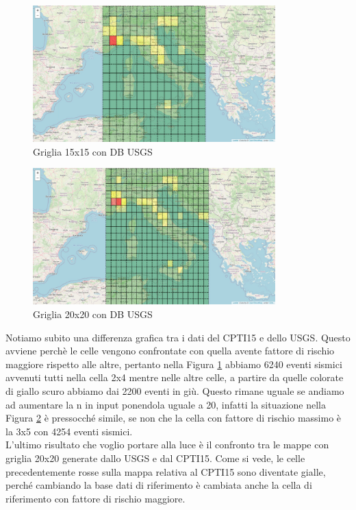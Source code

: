 \begin{figure}[H]
   \centering
   \includegraphics[width=0.835\textwidth]{images/15x15_USGS.jpg}
   \caption{Griglia 15x15 con DB USGS}
   \label{fig:15x15USGS}
\end{figure}

\begin{figure}[H]
   \centering
   \includegraphics[width=0.835\textwidth]{images/20x20_USGS.jpg}
   \caption{Griglia 20x20 con DB USGS}
   \label{fig:20x20USGS}
\end{figure}

Notiamo subito una differenza grafica tra i dati del CPTI15 e dello USGS. Questo avviene perch\`e le celle vengono confrontate con quella avente fattore di rischio maggiore rispetto alle altre, pertanto nella Figura \ref{fig:15x15USGS} abbiamo 6240 eventi sismici avvenuti tutti nella cella 2x4 mentre nelle altre celle, a partire da quelle colorate di giallo scuro abbiamo dai 2200 eventi in gi\`u. Questo rimane uguale se andiamo ad aumentare la n in input ponendola uguale a 20, infatti la situazione nella Figura \ref{fig:20x20USGS} \`e pressocch\'e simile, se non che la cella con fattore di rischio massimo \`e la 3x5 con 4254 eventi sismici.\\
L'ultimo risultato che voglio portare alla luce \`e il confronto tra le mappe con griglia 20x20 generate dallo USGS e dal CPTI15. Come si vede, le celle precedentemente rosse sulla mappa relativa al CPTI15 sono diventate gialle, perch\'e cambiando la base dati di riferimento \`e cambiata anche la cella di riferimento con fattore di rischio maggiore.

